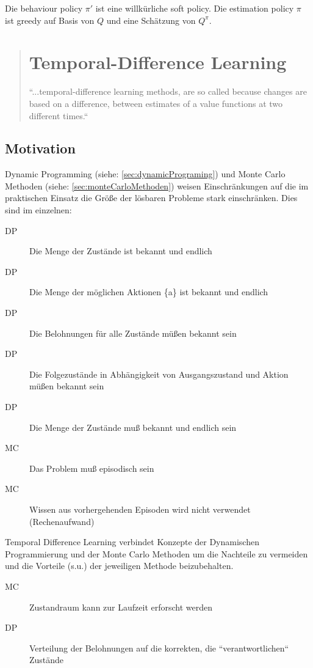 \documentclass[10pt]{scrartcl}
\begin{document}
Die behaviour policy $\pi'$ ist eine willkürliche soft policy. Die estimation policy $\pi$ ist greedy auf Basis von $Q$ und eine Schätzung von $Q^{\pi}$.

\begin{quote}
\section{Temporal-Difference Learning}
	``...temporal-difference learning methods, are so called because changes are based on a difference, between estimates of a value functions at two different times.`` \cite[][]{sutton:2005}
\end{quote}

	\subsection{Motivation}
	Dynamic Programming (siehe: \ref{sec:dynamicPrograming}) und Monte Carlo Methoden (siehe: \ref{sec:monteCarloMethoden}) weisen Einschränkungen auf die im praktischen Einsatz die Größe der lösbaren Probleme stark einschränken. Dies sind im einzelnen:
	\begin{description}
		\item[DP]{Die Menge der Zustände ist bekannt und endlich}
		\item[DP]{Die Menge der möglichen Aktionen \{a\} ist bekannt und endlich}
		\item[DP]{Die Belohnungen für alle Zustände müßen bekannt sein}
		\item[DP]{Die Folgezustände in Abhängigkeit von Ausgangszustand und Aktion müßen bekannt sein}
 		\item[DP]{Die Menge der Zustände muß bekannt und endlich sein}
		\item[MC]{Das Problem muß episodisch sein}
		\item[MC]{Wissen aus vorhergehenden Episoden wird nicht verwendet (Rechenaufwand)}
	\end{description}
	
	Temporal Difference Learning verbindet Konzepte der Dynamischen Programmierung und der Monte Carlo Methoden um die Nachteile zu vermeiden und die Vorteile (s.u.) der jeweiligen Methode beizubehalten.
	
	\begin{description}
		\item[MC] Zustandraum kann zur Laufzeit erforscht werden
		\item[DP] Verteilung der Belohnungen auf die korrekten, die ``verantwortlichen`` Zustände
	\end{description}
\end{document}
